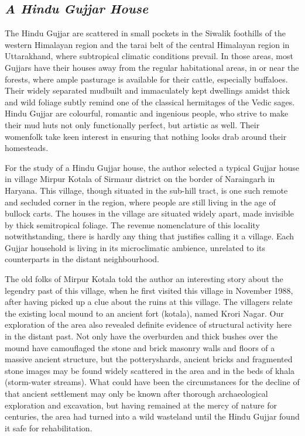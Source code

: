 \subsection*{\textit{A Hindu Gujjar House}}

The Hindu Gujjar are scattered in small pockets in the Siwalik foothills of the western Himalayan region and the tarai belt of the central Himalayan region in Uttarakhand, where subtropical climatic conditions prevail. In those areas, most Gujjars have their houses away from the regular habitational areas, in or near the forests, where ample pasturage is available for their cattle, especially buffaloes. Their widely separated mudbuilt and immaculately kept dwellings amidst thick and wild foliage subtly remind one of the classical hermitages of the Vedic sages. Hindu Gujjar are colourful, romantic and ingenious people, who strive to make their mud huts not only functionally perfect, but artistic as well. Their womenfolk take keen interest in ensuring that nothing looks drab around their homesteads.

For the study of a Hindu Gujjar house, the author selected a typical Gujjar house in village Mirpur Kotala of Sirmaur district on the border of Naraingarh in Haryana. This village, though situated in the sub-hill tract, is one such remote and secluded corner in the region, where people are still living in the age of bullock carts. The houses in the village are situated widely apart, made invisible by thick semitropical foliage. The revenue nomenclature of this locality notwithstanding, there is hardly any thing that justifies calling it a village. Each Gujjar household is living in its microclimatic ambience, unrelated to its counterparts in the distant neighbourhood.

The old folks of Mirpur Kotala told the author an interesting story about the legendry past of this village, when he first visited this village in November 1988, after having picked up a clue about the ruins at this village. The villagers relate the existing local mound to an ancient fort (kotala), named Krori Nagar. Our exploration of the area also revealed definite evidence of structural activity here in the distant past. Not only have the overburden and thick bushes over the mound have camouflaged the stone and brick masonry walls and floors of a massive ancient structure, but the potteryshards, ancient bricks and fragmented stone images may be found widely scattered in the area and in the beds of khala (storm-water streams). What could have been the circumstances for the decline of that ancient settlement may only be known after thorough archaeological exploration and excavation, but having remained at the mercy of nature for centuries, the area had turned into a wild wasteland until the Hindu Gujjar found it safe for rehabilitation.


